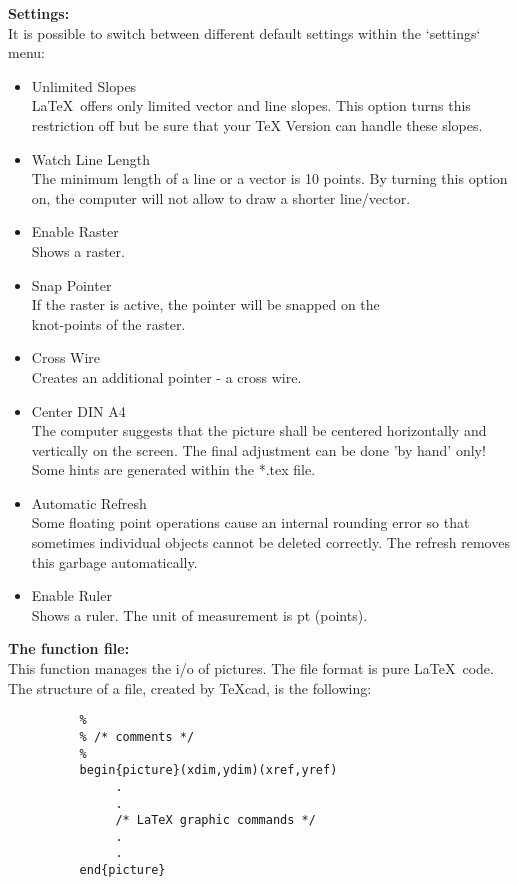\begin{description}
  \item{\bf Settings:} \\
     It is possible to switch between different default settings within
     the `settings` menu:
     \begin{itemize}
        \item Unlimited Slopes \\
          \LaTeX~offers only limited vector and line slopes.
          This option turns this restriction off but be sure
          that your TeX Version can handle these slopes.
        \item Watch Line Length \\
          The minimum length of a line or a vector is 10 points.
          By turning this option on, the computer will not allow to
          draw a shorter line/vector.

        \item Enable Raster \\
          Shows a raster.
        \item Snap Pointer \\
          If the raster is active, the pointer will be snapped
          on the\\
          knot-points of the raster.
        \item Cross Wire \\
          Creates an additional pointer - a cross wire.

        \item Center DIN A4 \\
          The computer suggests that the picture shall be
          centered horizontally and vertically on the screen.
          The final adjustment can be done 'by hand' only!
          Some hints are generated within the *.tex file.

        \item Automatic Refresh \\
          Some floating point operations cause an internal
          rounding error so that sometimes individual objects
          cannot be deleted correctly.
          The refresh removes this garbage automatically.
        \item Enable Ruler\\
          Shows a ruler.
          The unit of measurement is pt (points).
     \end{itemize}


  \item{\bf The function file:} \\
     This function manages the i/o of pictures.
     The file format is pure \LaTeX~code.
     The structure of a file, created by TeXcad, is the
     following:
     \begin{verbatim}
          %
          % /* comments */
          %
          begin{picture}(xdim,ydim)(xref,yref)
               .
               .
               /* LaTeX graphic commands */
               .
               .
          end{picture}
     \end{verbatim}


\end{description}
